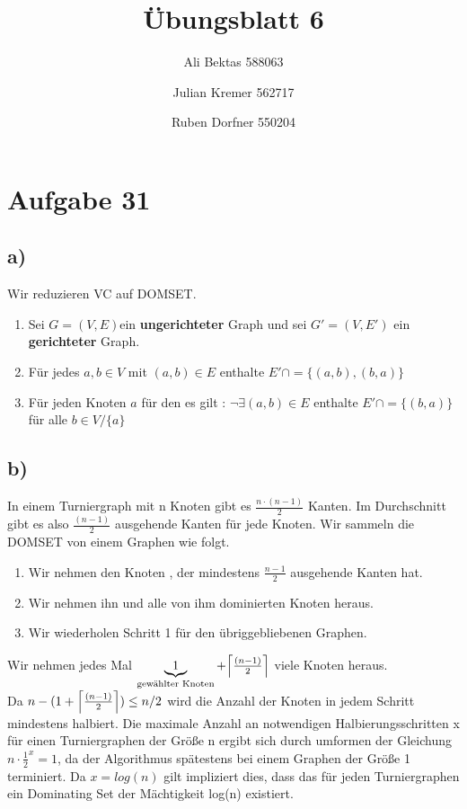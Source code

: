 \documentclass{article}
\title{Übungsblatt 6}
\author{Ali Bektas 588063 \and Julian Kremer 562717 \and Ruben Dorfner 550204}
\def\mathify#1{\ifmmode{#1}\else\mbox{$#1$}\fi} %
\newcommand{\ceil}[1]{\mathify{\left\lceil {#1}\right\rceil}}
\begin{document}
	\maketitle
	
	\section*{Aufgabe 31}
		\subsection*{a)}
			Wir reduzieren VC auf DOMSET.
			\begin{enumerate}
				\item Sei $G=(V,E)$ein \textbf{ungerichteter} Graph und sei $G'=(V,E')$ ein \textbf{gerichteter} Graph.
				\item Für jedes $a,b \in V$ mit $(a,b)\in E$ enthalte $E' \cap = \{(a,b),(b,a)\}$
				\item Für jeden Knoten $a$ für den es gilt : $\neg\exists (a,b)\in E$ enthalte $E' \cap = \{(b,a)\}$ für alle $b \in V/\{a\}$
			\end{enumerate}

		\subsection*{b)}
			In einem Turniergraph mit n Knoten gibt es $ \frac{n\cdot(n-1)}{2}$ Kanten. Im Durchschnitt gibt es also $ \frac{(n-1)}{2}$ ausgehende Kanten für jede Knoten. Wir sammeln die DOMSET von einem Graphen wie folgt. 

			\begin{enumerate}
				\item Wir nehmen den Knoten , der mindestens $\frac{n-1}{2}$ ausgehende Kanten hat.
				\item Wir nehmen ihn und alle von ihm dominierten Knoten heraus.
				\item Wir wiederholen Schritt 1 für den übriggebliebenen Graphen. 
			\end{enumerate}

			Wir nehmen jedes Mal $\underbrace{1}_{\text{gewählter Knoten}} +\ceil{\frac{(n-1)}{2}}$ viele Knoten heraus. \\
			Da $n - (1+{\ceil{\frac{(n-1)}{2}})} \leq n/2$ wird die Anzahl der Knoten in jedem Schritt mindestens halbiert.
		Die maximale Anzahl an notwendigen Halbierungsschritten x für einen Turniergraphen der Größe n ergibt sich durch umformen der Gleichung $n \cdot \frac{1}{2}^x = 1$, da der Algorithmus spätestens bei einem Graphen der Größe 1 terminiert. Da $x=log(n)$ gilt impliziert dies, dass das für jeden Turniergraphen ein Dominating Set der Mächtigkeit log(n) existiert.
 
\end{document}
